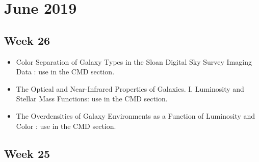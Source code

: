 \documentclass[ceqn,usenatbib,onecolumn]{mnras}
\begin{document}
\section{June 2019}
\subsection{Week 26}

\begin{itemize}
    \item \citet{2001AJ....122.1861S} Color Separation of Galaxy Types in the Sloan Digital Sky Survey Imaging Data : use in the CMD section.
    \item \citet{2003ApJS..149..289B} The Optical and Near-Infrared Properties of Galaxies. I. Luminosity and Stellar Mass Functions: use in the CMD section.
    \item \citet{2003ApJ...585L...5H} The Overdensities of Galaxy Environments as a Function of Luminosity and Color : use in the CMD section.
\end{itemize}

\subsection{Week 25}
\end{document}
